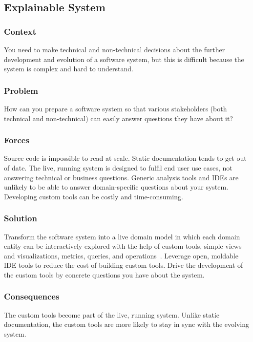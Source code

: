 \documentclass[sigconf]{acmart}
\begin{document}
\subsection*{Explainable System}\label{pat:explainableSystem}

\subsubsection*{Context}
You need to make technical and non-technical decisions about the further development and evolution of a software system, but this is difficult because the system is complex and hard to understand.

\subsubsection*{Problem}
How can you prepare a software system so that various stakeholders (both technical and non-technical) can easily answer questions they have about it?

\subsubsection*{Forces}
Source code is impossible to read at scale.
Static documentation tends to get out of date.
The live, running system is designed to fulfil end user use cases, not answering technical or business questions.
Generic analysis tools and IDEs are unlikely to be able to answer domain-specific questions about your system.
Developing custom tools can be costly and time-consuming.

\subsubsection*{Solution}
Transform the software system into a live domain model in which each domain entity can be interactively explored with the help of custom tools, \ie simple views and visualizations, metrics, queries, and operations~\cite{Nier22a}.
Leverage open, moldable IDE tools to reduce the cost of building custom tools.
Drive the development of the custom tools by concrete questions you have about the system.

\subsubsection*{Consequences}
The custom tools become part of the live, running system.
Unlike static documentation, the custom tools are more likely to stay in sync with the evolving system.
\end{document}
